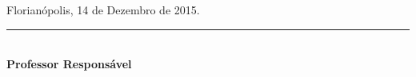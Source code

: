 \documentclass{ufsc-thesis}
\begin{document}
\begin{anexosenv}
    \vspace{40pt}

    \begin{flushright}

        Florianópolis, 14 de Dezembro de 2015.

    \end{flushright}

    \vspace{20pt}


    \begin{center}
        \small
        \parbox{7cm}{%
            \centering
            \rule{6cm}{1pt}\\
            \textbf{Professor Responsável}\\
            \imprimirorientador
        }
        \hfill
    \end{center}

\end{anexosenv}
\end{document}
